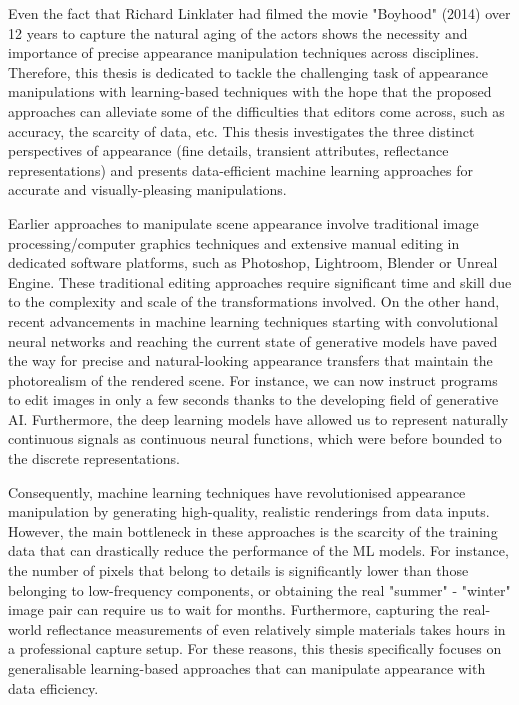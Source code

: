 Even the fact that Richard Linklater had filmed the movie "Boyhood" (2014) over 12 years to capture the natural aging of the actors shows the necessity and importance of precise appearance manipulation techniques across disciplines. Therefore, this thesis is dedicated to tackle the challenging task of appearance manipulations with learning-based techniques with the hope that the proposed approaches can alleviate some of the difficulties that editors come across, such as accuracy, the scarcity of data, etc. This thesis investigates the three distinct perspectives of appearance (fine details, transient attributes, reflectance representations) and presents data-efficient machine learning approaches for accurate and visually-pleasing manipulations.

Earlier approaches to manipulate scene appearance involve traditional image processing/computer graphics techniques and extensive manual editing in dedicated software platforms, such as Photoshop, Lightroom, Blender or Unreal Engine. These traditional editing approaches require significant time and skill due to the complexity and scale of the transformations involved. On the other hand, recent advancements in machine learning techniques starting with convolutional neural networks and reaching the current state of generative models have paved the way for precise and natural-looking appearance transfers that maintain the photorealism of the rendered scene. For instance, we can now instruct programs to edit images in only a few seconds thanks to the developing field of generative AI. Furthermore, the deep learning models have allowed us to represent naturally continuous signals as continuous neural functions, which were before bounded to the discrete representations. 

Consequently, machine learning techniques have revolutionised appearance manipulation by generating high-quality, realistic renderings from data inputs. However, the main bottleneck in these approaches is the scarcity of the training data that can drastically reduce the performance of the ML models. For instance, the number of pixels that belong to details is significantly lower than those belonging to low-frequency components, or obtaining the real "summer" - "winter" image pair can require us to wait for months. Furthermore, capturing the real-world reflectance measurements of even relatively simple materials takes hours in a professional capture setup. For these reasons, this thesis specifically focuses on generalisable learning-based approaches that can manipulate appearance with data efficiency.


